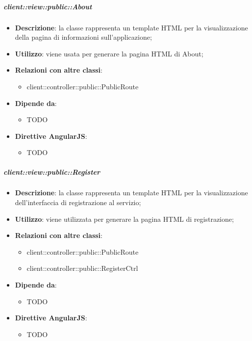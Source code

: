 		\subparagraph{client::view::public::About} %
		\label{subp:bdsm_app_client_view_public_about}
			\begin{itemize}
				\item \textbf{Descrizione}: la classe rappresenta un template HTML per la visualizzazione della pagina di informazioni sull'applicazione;
				\item \textbf{Utilizzo}: viene usata per generare la pagina HTML di About;
				\item \textbf{Relazioni con altre classi}:
					\begin{itemize}
						\item client::controller::public::PublicRoute
					\end{itemize}
				\item \textbf{Dipende da}:
					\begin{itemize}
						\item TODO
					\end{itemize}
				\item \textbf{Direttive AngularJS}:
					\begin{itemize}
						\item TODO
					\end{itemize}
			\end{itemize}

		\subparagraph{client::view::public::Register} %
		\label{subp:bdsm_app_client_view_public_register}
			\begin{itemize}
				\item \textbf{Descrizione}: la classe rappresenta un template HTML per la visualizzazione dell'interfaccia di registrazione al servizio;
				\item \textbf{Utilizzo}: viene utilizzata per generare la pagina HTML di registrazione;
				\item \textbf{Relazioni con altre classi}:
					\begin{itemize}
						\item client::controller::public::PublicRoute
						\item client::controller::public::RegisterCtrl
					\end{itemize}
				\item \textbf{Dipende da}:
					\begin{itemize}
						\item TODO
					\end{itemize}
				\item \textbf{Direttive AngularJS}:
					\begin{itemize}
						\item TODO
					\end{itemize}
			\end{itemize}

